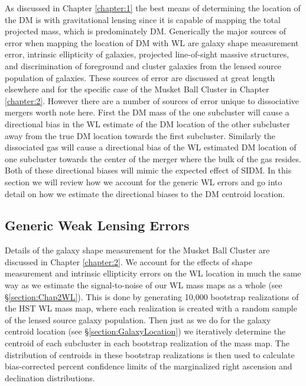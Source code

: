 As discussed in Chapter \ref{chapter:1} the best means of determining the location of the DM is with gravitational lensing since it is capable of mapping the total projected mass, which is predominately DM.
Generically the major sources of error when mapping the location of DM with WL are galaxy shape measurement error, intrinsic ellipticity of galaxies, projected line-of-sight massive structures, and discrimination of foreground and cluster galaxies from the lensed source population of galaxies.
These sources of error are discussed at great length elsewhere \citep[see e.g.][]{Schneider:2006tp, Dietrich:2011gs} and for the specific case of the Musket Ball Cluster in Chapter \ref{chapter:2}.
However there are a number of sources of error unique to dissociative mergers worth note here.
First the DM mass of the one subcluster will cause a directional bias in the WL estimate of the DM location of the other subcluster away from the true DM location towards the first subcluster.
Similarly the dissociated gas will cause a directional bias of the WL estimated DM location of one subcluster towards the center of the merger where the bulk of the gas resides.
Both of these directional biases will mimic the expected effect of SIDM.
In this section we will review how we account for the generic WL errors and go into detail on how we estimate the directional biases to the DM centroid location.

\subsection{Generic Weak Lensing Errors}

Details of the galaxy shape measurement for the Musket Ball Cluster are discussed in Chapter \ref{chapter:2}.
We account for the effects of shape measurement and intrinsic ellipticity errors on the WL location in much the same way as we estimate the signal-to-noise of our WL mass maps as a whole (see \S\ref{section:Chap2WL}).
This is done by generating 10,000 bootstrap realizations of the HST WL mass map, where each realization is created with a random sample of the lensed source galaxy population.
Then just as we do for the galaxy centroid location (see \S\ref{section:GalaxyLocation}) we iteratively determine the centroid of each subcluster in each bootstrap realization of the mass map.
The distribution of centroids in these bootstrap realizations is then used to  calculate bias-corrected percent confidence limits \citep{Beers:1990kg} of the marginalized right ascension and declination distributions.

